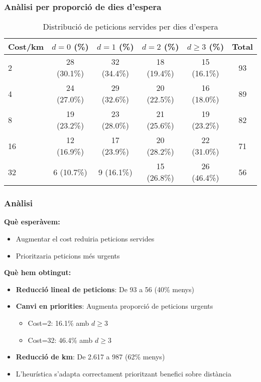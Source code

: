 \subsubsection{Anàlisi per proporció de dies d'espera}

\begin{table}[H]
\centering
\begin{tabular}{@{}lccccc@{}}
\toprule
\textbf{Cost/km} & \textbf{$d=0$ (\%)} & \textbf{$d=1$ (\%)} & \textbf{$d=2$ (\%)} & \textbf{$d \geq 3$ (\%)} & \textbf{Total} \\
\midrule
2 & 28 (30.1\%) & 32 (34.4\%) & 18 (19.4\%) & 15 (16.1\%) & 93 \\
4 & 24 (27.0\%) & 29 (32.6\%) & 20 (22.5\%) & 16 (18.0\%) & 89 \\
8 & 19 (23.2\%) & 23 (28.0\%) & 21 (25.6\%) & 19 (23.2\%) & 82 \\
16 & 12 (16.9\%) & 17 (23.9\%) & 20 (28.2\%) & 22 (31.0\%) & 71 \\
32 & 6 (10.7\%) & 9 (16.1\%) & 15 (26.8\%) & 26 (46.4\%) & 56 \\
\bottomrule
\end{tabular}
\caption{Distribució de peticions servides per dies d'espera}
\label{tab:exp6-distribucio}
\end{table}

\subsubsection{Anàlisi}

\textbf{Què esperàvem:}
\begin{itemize}
    \item Augmentar el cost reduiria peticions servides
    \item Prioritzaria peticions més urgents
\end{itemize}

\textbf{Què hem obtingut:}
\begin{itemize}
    \item \textbf{Reducció lineal de peticions}: De 93 a 56 (40\% menys)
    \item \textbf{Canvi en priorities}: Augmenta proporció de peticions urgents
    \begin{itemize}
        \item Cost=2: 16.1\% amb $d \geq 3$
        \item Cost=32: 46.4\% amb $d \geq 3$
    \end{itemize}
    \item \textbf{Reducció de km}: De 2.617 a 987 (62\% menys)
    \item L'heurística s'adapta correctament prioritzant benefici sobre distància
\end{itemize}

